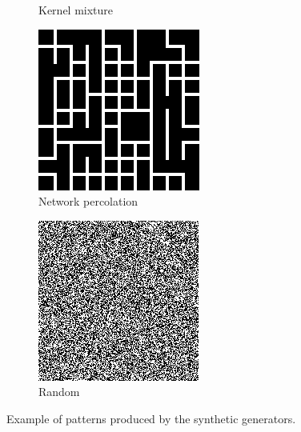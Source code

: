 \documentclass[letterpaper]{article}
\begin{document}
\begin{figure}
\begin{subfigure}[b]{0.2\textwidth}
        \caption{Kernel mixture}
        \label{fig:mixture}
    \end{subfigure}
    \begin{subfigure}[b]{0.2\textwidth}
        \includegraphics[width=\textwidth]{percolation}
        \caption{Network percolation}
        \label{fig:percolation}
    \end{subfigure}
    \begin{subfigure}[b]{0.2\textwidth}
        \includegraphics[width=\textwidth]{random}
        \caption{Random}
        \label{fig:random}
    \end{subfigure}
    \caption{Example of patterns produced by the synthetic generators.}
    \label{fig:generators}
\end{figure}
\end{document}
